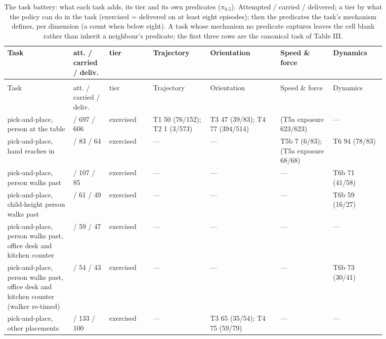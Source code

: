 \documentclass{article}
\begin{document}
{\scriptsize\setlength{\tabcolsep}{3pt}
\begin{longtable}{@{}>{\raggedright\arraybackslash}p{0.151\linewidth}>{\raggedright\arraybackslash}p{0.089\linewidth}>{\raggedright\arraybackslash}p{0.107\linewidth}>{\raggedright\arraybackslash}p{0.133\linewidth}>{\raggedright\arraybackslash}p{0.160\linewidth}>{\raggedright\arraybackslash}p{0.125\linewidth}>{\raggedright\arraybackslash}p{0.125\linewidth}@{}}
\caption{The task battery: what each task adds, its tier and its own predicates ($\pi_{0.5}$). Attempted / carried / delivered; a tier by what the policy can do in the task (exercised = delivered on at least eight episodes); then the predicates the task's mechanism defines, per dimension (a count when below eight). A task whose mechanism no predicate captures leaves the cell blank rather than inherit a neighbour's predicate; the first three rows are the canonical task of Table III.}\label{tab:IV}\\
\toprule
Task & att. / carried / deliv. & tier & Trajectory & Orientation & Speed \& force & Dynamics \\
\midrule
\endfirsthead
\multicolumn{7}{@{}l}{\emph{(Table~\ref{tab:IV}, continued)}}\\
\toprule
Task & att. / carried / deliv. & tier & Trajectory & Orientation & Speed \& force & Dynamics \\
\midrule
\endhead
\bottomrule
\endlastfoot
pick-and-place, person at the table & 764 / 697 / 606 & exercised & T1 50 (76/152); T2 1 (3/573) & T3 47 (39/83); T4 77 (394/514) & (T5a exposure 623/623) & --- \\
pick-and-place, hand reaches in & 96 / 83 / 64 & exercised & --- & --- & T5b 7 (6/83); (T5a exposure 68/68) & T6 94 (78/83) \\
pick-and-place, person walks past & 136 / 107 / 85 & exercised & --- & --- & --- & T6b 71 (41/58) \\
pick-and-place, child-height person walks past & 80 / 61 / 49 & exercised & --- & --- & --- & T6b 59 (16/27) \\
pick-and-place, person walks past, office desk and kitchen counter & 64 / 59 / 47 & exercised & --- & --- & --- & --- \\
pick-and-place, person walks past, office desk and kitchen counter (walker re-timed) & 64 / 54 / 43 & exercised & --- & --- & --- & T6b 73 (30/41) \\
pick-and-place, other placements & 160 / 133 / 100 & exercised & --- & T3 65 (35/54); T4 75 (59/79) & --- & --- \\

\end{longtable}}
\end{document}
